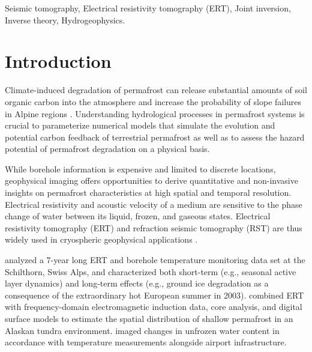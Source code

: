 \documentclass[extra]{gji}
\begin{document}
\begin{keywords}
 Seismic tomography, Electrical resistivity tomography (ERT), Joint inversion, Inverse theory, Hydrogeophysics.
\end{keywords}

\section{Introduction}
Climate-induced degradation of permafrost can release substantial amounts of soil organic carbon into the atmosphere \citep[e.g.,][]{Schuur2015} and increase the probability of slope failures in Alpine regions \citep[e.g.,][]{Huggel2012}.
Understanding hydrological processes in permafrost systems is crucial to parameterize numerical models that simulate the evolution and potential carbon feedback of terrestrial permafrost as well as to assess the hazard potential of permafrost degradation on a physical basis.

While borehole information is expensive and limited to discrete locations, geophysical imaging offers opportunities to derive quantitative and non-invasive insights on permafrost characteristics at high spatial and temporal resolution.
Electrical resistivity and acoustic velocity of a medium are sensitive to the phase change of water between its liquid, frozen, and gaseous states.
Electrical resistivity tomography (ERT) and refraction seismic tomography (RST) are thus widely used in cryospheric geophysical applications \citep{Hauck2008}.

\cite{Hilbich2008} analyzed a 7-year long ERT and borehole temperature monitoring data set at the Schilthorn, Swiss Alps, and characterized both short-term (e.g., seasonal active layer dynamics) and long-term effects (e.g., ground ice degradation as a consequence of the extraordinary hot European summer in 2003).
\cite{Dafflon2016} combined ERT with frequency-domain electromagnetic induction data, core analysis, and digital surface models to estimate the spatial distribution of shallow permafrost in an Alaskan tundra environment.
\cite{Oldenborger2018} imaged changes in unfrozen water content in accordance with temperature measurements alongside airport infrastructure.
\end{document}
